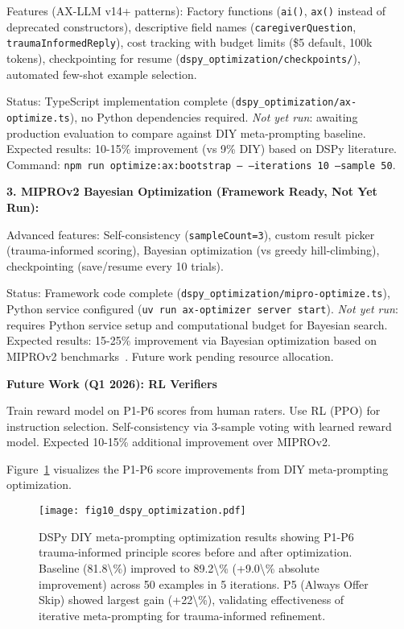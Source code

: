 \documentclass{article}
\begin{document}
Features (AX-LLM v14+ patterns): Factory functions (\texttt{ai()}, \texttt{ax()} instead of deprecated constructors), descriptive field names (\texttt{caregiverQuestion}, \texttt{traumaInformedReply}), cost tracking with budget limits (\$5 default, 100k tokens), checkpointing for resume (\texttt{dspy\_optimization/checkpoints/}), automated few-shot example selection.

Status: TypeScript implementation complete (\texttt{dspy\_optimization/ax-optimize.ts}), no Python dependencies required. \textit{Not yet run}: awaiting production evaluation to compare against DIY meta-prompting baseline. Expected results: 10-15\% improvement (vs 9\% DIY) based on DSPy literature. Command: \texttt{npm run optimize:ax:bootstrap -- --iterations 10 --sample 50}.

\textbf{3. MIPROv2 Bayesian Optimization (Framework Ready, Not Yet Run):}

Advanced features: Self-consistency (\texttt{sampleCount=3}), custom result picker (trauma-informed scoring), Bayesian optimization (vs greedy hill-climbing), checkpointing (save/resume every 10 trials).

Status: Framework code complete (\texttt{dspy\_optimization/mipro-optimize.ts}), Python service configured (\texttt{uv run ax-optimizer server start}). \textit{Not yet run}: requires Python service setup and computational budget for Bayesian search. Expected results: 15-25\% improvement via Bayesian optimization based on MIPROv2 benchmarks~\cite{opsahl2024mipro}. Future work pending resource allocation.

\textbf{Future Work (Q1 2026): RL Verifiers}

Train reward model on P1-P6 scores from human raters. Use RL (PPO) for instruction selection. Self-consistency via 3-sample voting with learned reward model. Expected 10-15\% additional improvement over MIPROv2.

Figure~\ref{fig:dspy} visualizes the P1-P6 score improvements from DIY meta-prompting optimization.

%
\begin{figure}[htbp]%
\centering%
\texttt{[image: fig10\_dspy\_optimization.pdf]}%
\caption{DSPy DIY meta-prompting optimization results showing P1-P6 trauma-informed principle scores before and after optimization. Baseline (81.8\textbackslash{}\%) improved to 89.2\textbackslash{}\% (+9.0\textbackslash{}\% absolute improvement) across 50 examples in 5 iterations. P5 (Always Offer Skip) showed largest gain (+22\textbackslash{}\%), validating effectiveness of iterative meta-prompting for trauma-informed refinement.}%
\label{fig:dspy}%
\end{figure}%
\end{document}
